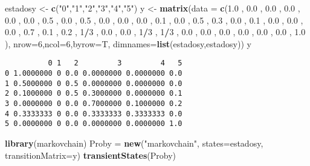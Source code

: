 \documentclass[
]{article}
\newenvironment{Shaded}{\begin{snugshade}}{\end{snugshade}}
\newcommand{\DataTypeTok}[1]{\textcolor[rgb]{0.13,0.29,0.53}{#1}}
\newcommand{\DecValTok}[1]{\textcolor[rgb]{0.00,0.00,0.81}{#1}}
\newcommand{\FloatTok}[1]{\textcolor[rgb]{0.00,0.00,0.81}{#1}}
\newcommand{\KeywordTok}[1]{\textcolor[rgb]{0.13,0.29,0.53}{\textbf{#1}}}
\newcommand{\NormalTok}[1]{#1}
\newcommand{\OperatorTok}[1]{\textcolor[rgb]{0.81,0.36,0.00}{\textbf{#1}}}
\newcommand{\StringTok}[1]{\textcolor[rgb]{0.31,0.60,0.02}{#1}}
\begin{document}
\begin{Shaded}
\begin{Highlighting}[]
\NormalTok{estadosy <-}\StringTok{ }\KeywordTok{c}\NormalTok{(}\StringTok{"0"}\NormalTok{,}\StringTok{"1"}\NormalTok{,}\StringTok{"2"}\NormalTok{,}\StringTok{"3"}\NormalTok{,}\StringTok{"4"}\NormalTok{,}\StringTok{"5"}\NormalTok{)}
\NormalTok{y <-}\StringTok{ }\KeywordTok{matrix}\NormalTok{(}\DataTypeTok{data =} \KeywordTok{c}\NormalTok{(}\FloatTok{1.0}\NormalTok{ , }\FloatTok{0.0}\NormalTok{ , }\FloatTok{0.0}\NormalTok{ , }\FloatTok{0.0}\NormalTok{ , }\FloatTok{0.0}\NormalTok{ , }\FloatTok{0.0}\NormalTok{ ,}
\FloatTok{0.5}\NormalTok{ , }\FloatTok{0.0}\NormalTok{ , }\FloatTok{0.5}\NormalTok{ , }\FloatTok{0.0}\NormalTok{ , }\FloatTok{0.0}\NormalTok{ , }\FloatTok{0.0}\NormalTok{ ,}
\FloatTok{0.1}\NormalTok{ , }\FloatTok{0.0}\NormalTok{ , }\FloatTok{0.5}\NormalTok{ , }\FloatTok{0.3}\NormalTok{ , }\FloatTok{0.0}\NormalTok{ , }\FloatTok{0.1}\NormalTok{ ,}
\FloatTok{0.0}\NormalTok{ , }\FloatTok{0.0}\NormalTok{ , }\FloatTok{0.0}\NormalTok{ , }\FloatTok{0.7}\NormalTok{ , }\FloatTok{0.1}\NormalTok{ , }\FloatTok{0.2}\NormalTok{ ,}
\DecValTok{1}\OperatorTok{/}\DecValTok{3}\NormalTok{ , }\FloatTok{0.0}\NormalTok{ , }\FloatTok{0.0}\NormalTok{ , }\DecValTok{1}\OperatorTok{/}\DecValTok{3}\NormalTok{ , }\DecValTok{1}\OperatorTok{/}\DecValTok{3}\NormalTok{ , }\FloatTok{0.0}\NormalTok{ ,}
\FloatTok{0.0}\NormalTok{ , }\FloatTok{0.0}\NormalTok{ , }\FloatTok{0.0}\NormalTok{ , }\FloatTok{0.0}\NormalTok{ , }\FloatTok{0.0}\NormalTok{ , }\FloatTok{1.0}
\NormalTok{), }\DataTypeTok{nrow=}\DecValTok{6}\NormalTok{,}\DataTypeTok{ncol=}\DecValTok{6}\NormalTok{,}\DataTypeTok{byrow=}\NormalTok{T, }\DataTypeTok{dimnames=}\KeywordTok{list}\NormalTok{(estadosy,estadosy))}
\NormalTok{y}
\end{Highlighting}
\end{Shaded}

\begin{verbatim}
          0 1   2         3         4   5
0 1.0000000 0 0.0 0.0000000 0.0000000 0.0
1 0.5000000 0 0.5 0.0000000 0.0000000 0.0
2 0.1000000 0 0.5 0.3000000 0.0000000 0.1
3 0.0000000 0 0.0 0.7000000 0.1000000 0.2
4 0.3333333 0 0.0 0.3333333 0.3333333 0.0
5 0.0000000 0 0.0 0.0000000 0.0000000 1.0
\end{verbatim}

\begin{Shaded}
\begin{Highlighting}[]
\KeywordTok{library}\NormalTok{(markovchain)}
\NormalTok{Proby =}\StringTok{ }\KeywordTok{new}\NormalTok{(}\StringTok{"markovchain"}\NormalTok{, }\DataTypeTok{states=}\NormalTok{estadosy, }\DataTypeTok{transitionMatrix=}\NormalTok{y)}
\KeywordTok{transientStates}\NormalTok{(Proby)}
\end{Highlighting}
\end{Shaded}
\end{document}
